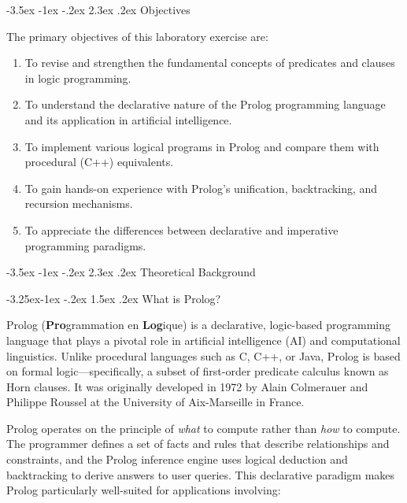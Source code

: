 \documentclass[12pt,a4paper]{article}
\makeatletter
\renewcommand{\section}{\@startsection{section}{1}{\z@}%
  {-3.5ex \@plus -1ex \@minus -.2ex}%
  {2.3ex \@plus.2ex}%
  {\normalfont\Large\bfseries}}
\renewcommand{\subsection}{\@startsection{subsection}{2}{\z@}%
  {-3.25ex\@plus -1ex \@minus -.2ex}%
  {1.5ex \@plus .2ex}%
  {\normalfont\large\bfseries}}
\makeatother
\begin{document}
\section{Objectives}

The primary objectives of this laboratory exercise are:

\begin{enumerate}
    \item To revise and strengthen the fundamental concepts of predicates and clauses in logic programming.
    \item To understand the declarative nature of the Prolog programming language and its application in artificial intelligence.
    \item To implement various logical programs in Prolog and compare them with procedural (C++) equivalents.
    \item To gain hands-on experience with Prolog's unification, backtracking, and recursion mechanisms.
    \item To appreciate the differences between declarative and imperative programming paradigms.
\end{enumerate}

\section{Theoretical Background}

\subsection{What is Prolog?}

Prolog (\textbf{Pro}grammation en \textbf{Log}ique) is a declarative, logic-based programming language that plays a pivotal role in artificial intelligence (AI) and computational linguistics. Unlike procedural languages such as C, C++, or Java, Prolog is based on formal logic---specifically, a subset of first-order predicate calculus known as Horn clauses. It was originally developed in 1972 by Alain Colmerauer and Philippe Roussel at the University of Aix-Marseille in France.

Prolog operates on the principle of \textit{what} to compute rather than \textit{how} to compute. The programmer defines a set of facts and rules that describe relationships and constraints, and the Prolog inference engine uses logical deduction and backtracking to derive answers to user queries. This declarative paradigm makes Prolog particularly well-suited for applications involving:
\end{document}
